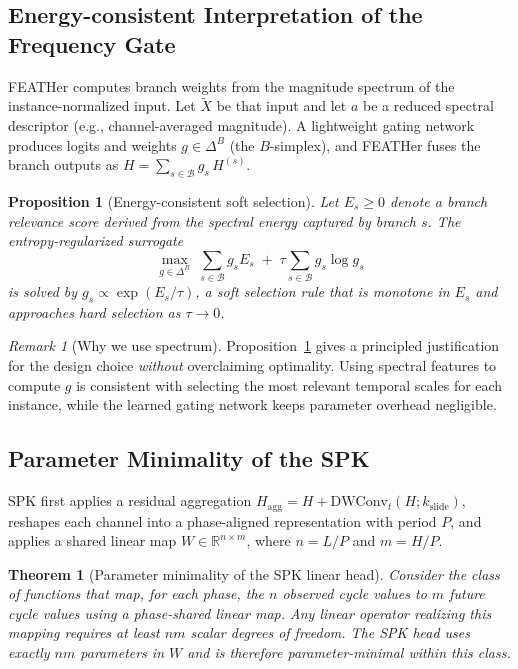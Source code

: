 \documentclass[journal]{IEEEtran}
\newtheorem{theorem}{Theorem}
\newtheorem{proposition}{Proposition} %
\theoremstyle{remark}
\newtheorem{remark}{Remark}
\begin{document}
\subsection{Energy-consistent Interpretation of the Frequency Gate}
FEATHer computes branch weights from the magnitude spectrum of the
instance-normalized input. Let $\widetilde{X}$ be that input and let
$a$ be a reduced spectral descriptor (e.g., channel-averaged
magnitude). A lightweight gating network produces logits and weights
$g \in \Delta^B$ (the $B$-simplex), and FEATHer fuses the branch
outputs as $H = \sum_{s \in \mathcal{B}} g_s\, H^{(s)}$.

\begin{proposition}[Energy-consistent soft selection]
\label{prop:energy-gate}
Let $E_s \ge 0$ denote a branch relevance score derived from the
spectral energy captured by branch $s$. The entropy-regularized
surrogate
\begin{equation*}
\max_{g \in \Delta^B} \;\sum_{s \in \mathcal{B}} g_s E_s
       \;+\; \tau \sum_{s \in \mathcal{B}} g_s \log g_s
\end{equation*}
is solved by $g_s \propto \exp(E_s / \tau)$, a soft selection rule that
is monotone in $E_s$ and approaches hard selection as $\tau \to 0$.
\end{proposition}

\begin{remark}[Why we use spectrum]
\label{rem:gate-justify}
Proposition~\ref{prop:energy-gate} gives a principled justification for
the design choice \emph{without} overclaiming optimality. Using
spectral features to compute $g$ is consistent with selecting the most
relevant temporal scales for each instance, while the learned gating
network keeps parameter overhead negligible.
\end{remark}

\subsection{Parameter Minimality of the SPK}
SPK first applies a residual aggregation
$H_{\mathrm{agg}} = H + \mathrm{DWConv}_t(H; k_{\mathrm{slide}})$,
reshapes each channel into a phase-aligned representation with period
$P$, and applies a shared linear map $W \in \mathbb{R}^{n \times m}$,
where $n = L/P$ and $m = H/P$.

\begin{theorem}[Parameter minimality of the SPK linear head]
\label{thm:spk-minimal}
Consider the class of functions that map, for each phase, the $n$
observed cycle values to $m$ future cycle values using a
phase-\emph{shared} linear map. Any linear operator realizing this
mapping requires at least $nm$ scalar degrees of freedom. The SPK head
uses exactly $nm$ parameters in $W$ and is therefore
parameter-minimal within this class.
\end{theorem}
\end{document}
